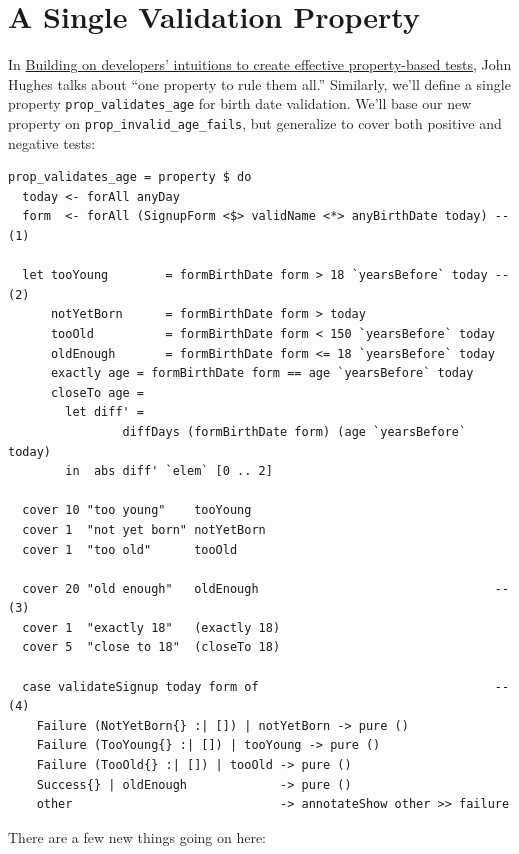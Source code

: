 \section{A Single Validation
Property}\label{a-single-validation-property}

In \href{https://www.youtube.com/watch?v=NcJOiQlzlXQ}{Building on
developers' intuitions to create effective property-based tests}, John
Hughes talks about ``one property to rule them all.'' Similarly, we'll
define a single property \texttt{prop\_validates\_age} for birth date
validation. We'll base our new property on
\texttt{prop\_invalid\_age\_fails}, but generalize to cover both
positive and negative tests:

\begin{verbatim}
prop_validates_age = property $ do
  today <- forAll anyDay
  form  <- forAll (SignupForm <$> validName <*> anyBirthDate today) -- (1)

  let tooYoung        = formBirthDate form > 18 `yearsBefore` today -- (2)
      notYetBorn      = formBirthDate form > today
      tooOld          = formBirthDate form < 150 `yearsBefore` today
      oldEnough       = formBirthDate form <= 18 `yearsBefore` today
      exactly age = formBirthDate form == age `yearsBefore` today
      closeTo age =
        let diff' =
                diffDays (formBirthDate form) (age `yearsBefore` today)
        in  abs diff' `elem` [0 .. 2]

  cover 10 "too young"    tooYoung
  cover 1  "not yet born" notYetBorn
  cover 1  "too old"      tooOld

  cover 20 "old enough"   oldEnough                                 -- (3)
  cover 1  "exactly 18"   (exactly 18)
  cover 5  "close to 18"  (closeTo 18)

  case validateSignup today form of                                 -- (4)
    Failure (NotYetBorn{} :| []) | notYetBorn -> pure ()
    Failure (TooYoung{} :| []) | tooYoung -> pure ()
    Failure (TooOld{} :| []) | tooOld -> pure ()
    Success{} | oldEnough             -> pure ()
    other                             -> annotateShow other >> failure
\end{verbatim}
There are a few new things going on here:

